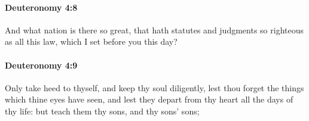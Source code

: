 		\paragraph{Deuteronomy 4:8} %
			\label{DEUTERONOMY-4-8}

			And what nation is there so great, that hath statutes and judgments so righteous as all this law, which I set before you this day?


		\paragraph{Deuteronomy 4:9} %
			\label{DEUTERONOMY-4-9}

			Only take heed to thyself, and keep thy soul diligently, lest thou forget the things which thine eyes have seen, and lest they depart from thy heart all the days of thy life: but teach them thy sons, and thy sons' sons;


